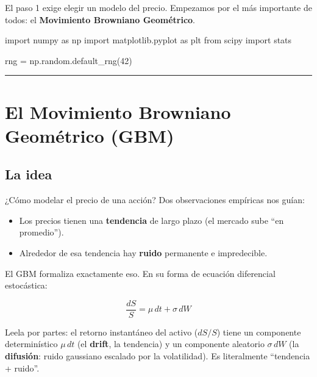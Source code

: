 \documentclass[
  spanish,
  letterpaper,
  DIV=11,
  numbers=noendperiod]{scrreprt}
\newenvironment{Shaded}{\begin{snugshade}}{\end{snugshade}}
\newcommand{\DecValTok}[1]{\textcolor[rgb]{0.68,0.00,0.00}{#1}}
\newcommand{\ImportTok}[1]{\textcolor[rgb]{0.00,0.46,0.62}{#1}}
\newcommand{\NormalTok}[1]{\textcolor[rgb]{0.00,0.23,0.31}{#1}}
\newcommand{\OperatorTok}[1]{\textcolor[rgb]{0.37,0.37,0.37}{#1}}
\providecommand{\tightlist}{%
  \setlength{\itemsep}{0pt}\setlength{\parskip}{0pt}}
\begin{document}
El paso 1 exige elegir un modelo del precio. Empezamos por el más
importante de todos: el \textbf{Movimiento Browniano Geométrico}.

\label{setup}
\begin{Shaded}
\begin{Highlighting}[]
\ImportTok{import}\NormalTok{ numpy }\ImportTok{as}\NormalTok{ np}
\ImportTok{import}\NormalTok{ matplotlib.pyplot }\ImportTok{as}\NormalTok{ plt}
\ImportTok{from}\NormalTok{ scipy }\ImportTok{import}\NormalTok{ stats}

\NormalTok{rng }\OperatorTok{=}\NormalTok{ np.random.default\_rng(}\DecValTok{42}\NormalTok{)}
\end{Highlighting}
\end{Shaded}

\begin{center}\rule{0.5\linewidth}{0.5pt}\end{center}

\chapter{El Movimiento Browniano Geométrico
(GBM)}\label{el-movimiento-browniano-geomuxe9trico-gbm}

\section{La idea}\label{la-idea}

¿Cómo modelar el precio de una acción? Dos observaciones empíricas nos
guían:

\begin{itemize}
\tightlist
\item
  Los precios tienen una \textbf{tendencia} de largo plazo (el mercado
  sube ``en promedio'').
\item
  Alrededor de esa tendencia hay \textbf{ruido} permanente e
  impredecible.
\end{itemize}

El GBM formaliza exactamente eso. En su forma de ecuación diferencial
estocástica:

\[\frac{dS}{S} = \mu \, dt + \sigma \, dW\]

Leela por partes: el retorno instantáneo del activo (\(dS/S\)) tiene un
componente determinístico \(\mu\,dt\) (el \textbf{drift}, la tendencia)
y un componente aleatorio \(\sigma\,dW\) (la \textbf{difusión}: ruido
gaussiano escalado por la volatilidad). Es literalmente ``tendencia +
ruido''.
\end{document}
